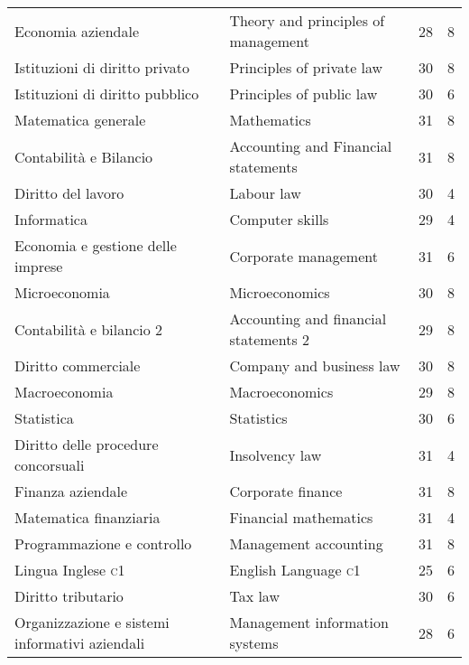 \documentclass[a4paper,10pt]{article}
\begin{document}
\begin{center}

	\tabletail{%
	}
	\tablelasttail{}

	\begin{supertabular}{p{4.9cm} p{4.9cm} c c}
		Economia aziendale&Theory and principles of management& 28 & 8\\
		Istituzioni di diritto privato&Principles of private law&30&8\\
		Istituzioni di diritto pubblico
		&
		Principles of public law
		& 30&
		6
		\\
		Matematica generale
		& Mathematics
		&31&8\\
		Contabilit\`a e Bilancio
		& Accounting and Financial statements
		& 31 & 8\\
		Diritto del lavoro
		&
		Labour law
		& 30&
		4
		\\
		Informatica & Computer skills &29& 4
		\\
		Economia e gestione delle imprese & Corporate management &31&6
		\\
		Microeconomia & Microeconomics &30&8
		\\
		Contabilit\`a e bilancio 2 & Accounting and financial statements 2
		&29&8 \\
		Diritto commerciale & Company and business law &30&8
		\\
		Macroeconomia & Macroeconomics &29&8
		\\
		Statistica & Statistics &30&6\\
		Diritto delle procedure concorsuali & Insolvency law &31&4
		\\
		Finanza aziendale
		& Corporate finance
		&31 &8 \\
		Matematica finanziaria & Financial mathematics &31&4
		\\
		Programmazione e controllo
		& Management accounting &31&8
		\\
		Lingua Inglese \textsc{c1}& English Language \textsc{c1}& 25&6\\
		Diritto tributario & Tax law &30&6
		\\
		Organizzazione e sistemi informativi aziendali &Management information systems &28&6

\end{supertabular}
\end{center}
\end{document}
